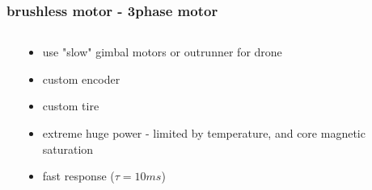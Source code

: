 \documentclass{beamer}
\begin{document}
\begin{frame}
  
  \frametitle{\bf brushless motor - 3phase motor}

  \begin{columns}

    \begin{column}{0.5\textwidth}
    \end{column}

    \begin{column}{0.5\textwidth}
      \begin{itemize}
        \item use "slow" gimbal motors or outrunner for drone
        \item custom encoder
        \item custom tire
        \item extreme huge power - limited by temperature, and core magnetic saturation
        \item fast response ($\tau = 10ms$)
       
      \end{itemize}
    \end{column}

  \end{columns}
  
\end{frame}
\end{document}
